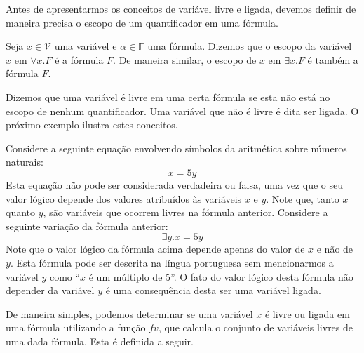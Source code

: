 Antes de apresentarmos os conceitos de variável livre e ligada,
devemos definir de maneira precisa o escopo de um quantificador em uma
fórmula.
\begin{Definition}
Seja $x\in\mathcal{V}$ uma variável e $\alpha \in\mathbb{F}$ uma
fórmula. Dizemos que o escopo da variável $x$ em $\forall x. F$ é a
fórmula $F$. De maneira similar, o escopo de $x$ em $\exists x. F$ é
também a fórmula $F$.
\end{Definition}
Dizemos que uma variável é livre em uma certa fórmula se esta não está
no escopo de nenhum quantificador. Uma variável que não é livre é dita
ser ligada. O próximo exemplo ilustra estes conceitos.
\begin{Example}\label{freeboundexample}
  Considere a seguinte equação envolvendo símbolos da aritmética sobre
  números naturais:
  \[
  x = 5y
  \]
  Esta equação não pode ser considerada verdadeira ou falsa, uma vez
  que o seu valor lógico depende dos valores atribuídos às variáveis
  $x$ e $y$. Note que, tanto $x$ quanto $y$, são variáveis que ocorrem
  livres na fórmula anterior. Considere a seguinte variação da fórmula
  anterior:
 \[
 \exists y. x = 5y
 \]
 Note que o valor lógico da fórmula acima depende apenas do valor de
 $x$ e não de $y$. Esta fórmula pode ser descrita na língua portuguesa
 sem mencionarmos a variável $y$ como ``$x$ é um múltiplo de 5''. O
 fato do valor lógico desta fórmula não depender da variável $y$ é uma
 consequência desta ser uma variável ligada.
\end{Example}
De maneira simples, podemos determinar se uma variável $x$ é livre ou
ligada em uma fórmula utilizando a função $fv$, que calcula o
conjunto de variáveis livres de uma dada fórmula. Esta
é definida a seguir.
